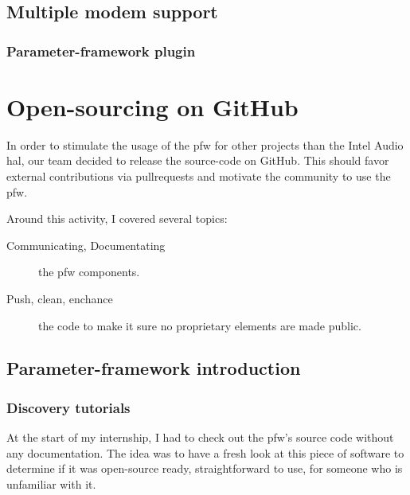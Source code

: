 \subsection{Multiple modem support}
\subsubsection{Parameter-framework plugin}

\section{Open-sourcing on GitHub}
In order to stimulate the usage of the \gls{pfw} for other projects than the Intel Audio \gls{hal},
our team decided to release the source-code on GitHub.
This should favor external contributions via \gls{pullrequests} and motivate
the community to use the \gls{pfw}.

Around this activity, I covered several topics:
\begin{description}
    \item[Communicating, Documentating] the \gls{pfw} components.
    \item[Push, clean, enchance] the code to make it sure no proprietary
        elements are made public.
\end{description}

\subsection{Parameter-framework introduction}
\subsubsection{Discovery tutorials}\label{sec:tutorials}

At the start of my internship, I had to check out the \gls{pfw}'s
source code without any documentation. The idea was to have a fresh look at
this piece of software to determine if it was open-source ready, straightforward
to use, for someone who is unfamiliar with it.

